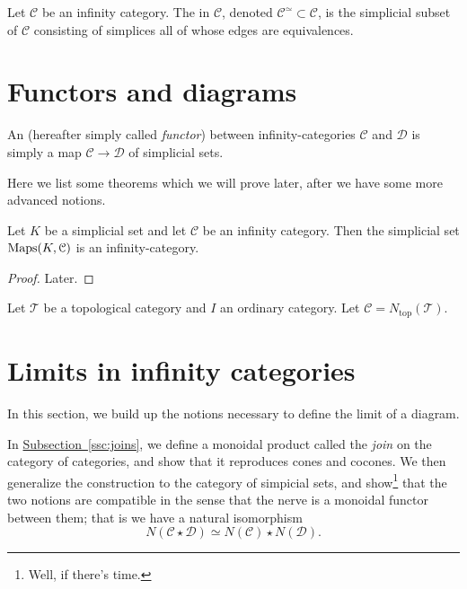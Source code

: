 \documentclass[main.tex]{subfiles}
\begin{document}
\begin{definition}
  \label{def:maximal_infinity_groupoid}
  Let $\mathcal{C}$ be an infinity category. The  in $\mathcal{C}$, denoted $\mathcal{C}^{\simeq} \subset \mathcal{C}$, is the simplicial subset of $\mathcal{C}$ consisting of simplices all of whose edges are equivalences.
\end{definition}

\section{Functors and diagrams}
\label{sec:functors_and_diagrams}

\begin{definition}
  \label{def:infinity_functor}
  An  (hereafter simply called \emph{functor}) between infinity-categories $\mathcal{C}$ and $\mathcal{D}$ is simply a map $\mathcal{C} \to \mathcal{D}$ of simplicial sets.
\end{definition}

Here we list some theorems which we will prove later, after we have some more advanced notions.

\begin{proposition}
  Let $K$ be a simplicial set and let $\mathcal{C}$ be an infinity category. Then the simplicial set $\operatorname{Maps}(K, \mathcal{C})$ is an infinity-category.
\end{proposition}
\begin{proof}
  Later.
\end{proof}

\begin{definition}
  \label{def:homotopy_coherent_diagram}
  Let $\mathcal{T}$ be a topological category and $I$ an ordinary category. Let $\mathcal{C} = N_{\mathrm{top}}(\mathcal{T})$.
\end{definition}

\section{Limits in infinity categories}
\label{sec:limits_in_infinity_categories}

In this section, we build up the notions necessary to define the limit of a diagram.

In \hyperref[ssc:joins]{Subsection~\ref*{ssc:joins}}, we define a monoidal product called the \emph{join} on the category of categories, and show that it reproduces cones and cocones. We then generalize the construction to the category of simpicial sets, and show\footnote{Well, if there's time.} that the two notions are compatible in the sense that the nerve is a monoidal functor between them; that is we have a natural isomorphism
\begin{equation*}
  N(\mathcal{C} \star \mathcal{D}) \simeq N(\mathcal{C}) \star N(\mathcal{D}).
\end{equation*}
\end{document}
